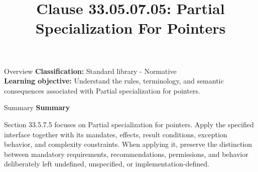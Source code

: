 \documentclass[10pt,letterpaper]{article}
\title{Clause 33.05.07.05: Partial Specialization For Pointers}
\author{}
\date{}
\begin{document}
\maketitle
\begin{CornellOverviewBox}{Overview}
\textbf{Classification:} Standard library - Normative\\[2pt]
\textbf{Learning objective:} Understand the rules, terminology, and semantic consequences associated with Partial specialization for pointers.
\end{CornellOverviewBox}\begin{CornellSummaryBox}{Summary}
{\sffamily\bfseries\color{Accent} Summary}\par\vspace{3pt}Section 33.5.7.5 focuses on Partial specialization for pointers. Apply the specified interface together with its mandates, effects, result conditions, exception behavior, and complexity constraints. When applying it, preserve the distinction between mandatory requirements, recommendations, permissions, and behavior deliberately left undefined, unspecified, or implementation-defined.
\end{CornellSummaryBox}
\end{document}
